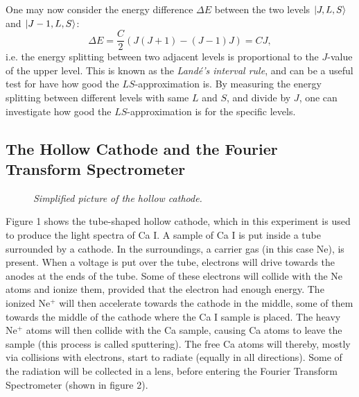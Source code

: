 \documentclass[a4paper]{article}
\begin{document}
One may now consider the energy difference $\Delta E$ between the two levels $\Ket{J,L,S}$ and $\Ket{J-1,L,S}$:
\begin{equation}
\Delta E = \frac{C}{2} ( J(J+1) - (J-1)J ) = C J,
\end{equation} 
i.e. the energy splitting between two adjacent levels is proportional to the $J$-value of the upper level. This is known as the \textit{Land\'e's interval rule}, and can be a useful test for have how good the $LS$-approximation is. By measuring the energy splitting between different levels with same $L$ and $S$, and divide by $J$, one can investigate how good the $LS$-approximation is for the specific levels. 


\subsection{The Hollow Cathode and the Fourier Transform Spectrometer}

\begin{figure}[htb!]
\label{HC}
\begin{center}
\end{center}
\caption{\textit{Simplified picture of the hollow cathode.}}
\end{figure}

Figure 1 shows the tube-shaped hollow cathode, which in this experiment is used to produce the light spectra of Ca I. A sample of Ca I is put inside a tube surrounded by a cathode. In the surroundings, a carrier gas (in this case Ne), is present. When a voltage is put over the tube, electrons will drive towards the anodes at the ends of the tube. Some of these electrons will collide with the Ne atoms and ionize them, provided that the electron had enough energy. The ionized Ne$^+$ will then accelerate towards the cathode in the middle, some of them towards the middle of the cathode where the Ca I sample is placed. The heavy Ne$^+$ atoms will then collide with the Ca sample, causing Ca atoms to leave the sample (this process is called sputtering). The free Ca atoms will thereby, mostly via collisions with electrons, start to radiate (equally in all directions). Some of the radiation will be collected in a lens, before entering the Fourier Transform Spectrometer (shown in figure 2).
\end{document}
